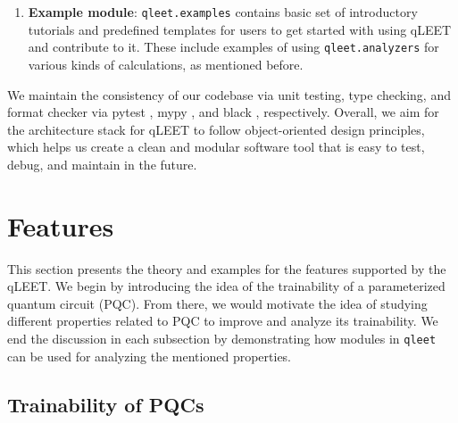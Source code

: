 \documentclass[%
 reprint,
 amsmath,
 amssymb,
 showkeys,
 pra,
 floatfix,
]{revtex4-2}
\begin{document}
\begin{enumerate}
	\item \textbf{Example module}: \texttt{qleet.examples} contains basic set of introductory tutorials and predefined templates for users to get started with using qLEET and contribute to it. These include examples of using \texttt{qleet.analyzers} for various kinds of calculations, as mentioned before.

\end{enumerate} 

We maintain the consistency of our codebase via unit testing, type checking, and format checker via pytest \cite{pytestx.y}, mypy \cite{mypy}, and black \cite{black}, respectively. Overall, we aim for the architecture stack for qLEET to follow object-oriented design principles, which helps us create a clean and modular software tool that is easy to test, debug, and maintain in the future. 



\section{\label{sec:features}Features}

This section presents the theory and examples for the features supported by the qLEET. We begin by introducing the idea of the trainability of a parameterized quantum circuit (PQC). From there, we would motivate the idea of studying different properties related to PQC to improve and analyze its trainability. We end the discussion in each subsection by demonstrating how modules in \texttt{qleet} can be used for analyzing the mentioned properties. 

\subsection{\label{sec:training}Trainability of PQCs}
\end{document}
